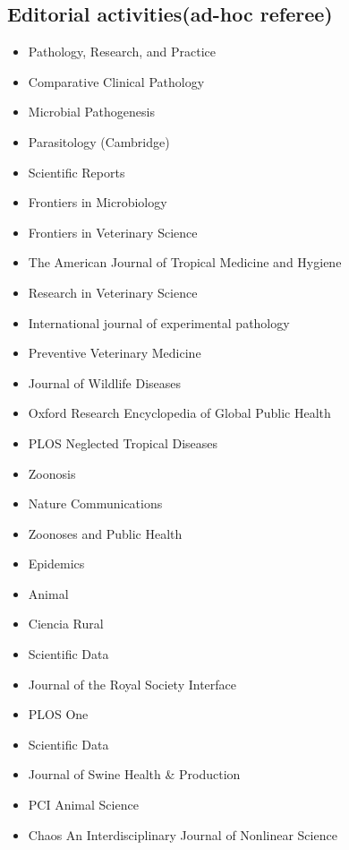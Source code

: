 \documentclass[11pt]{article}
\begin{document}
\subsection{Editorial activities(ad-hoc referee)}

\begin{itemize}
  \item Pathology, Research, and Practice
  \item Comparative Clinical Pathology
  \item Microbial Pathogenesis 
  \item Parasitology (Cambridge) 
  \item Scientific Reports 
  \item Frontiers in Microbiology 
  \item Frontiers in Veterinary Science
  \item The American Journal of Tropical Medicine and Hygiene
  \item Research in Veterinary Science
  \item International journal of experimental pathology 
  \item Preventive Veterinary Medicine 
  \item Journal of Wildlife Diseases  
  \item Oxford Research Encyclopedia of Global Public Health
  \item PLOS Neglected Tropical Diseases
  \item Zoonosis 
  \item Nature Communications
  \item Zoonoses and Public Health
  \item Epidemics
  \item Animal
  \item Ciencia Rural
  \item Scientific Data
  \item Journal of the Royal Society Interface
  \item PLOS One
  \item Scientific Data
  \item Journal of Swine Health & Production
  \item PCI Animal Science
  \item Chaos An Interdisciplinary Journal of Nonlinear Science
\end{itemize}
\end{document}
